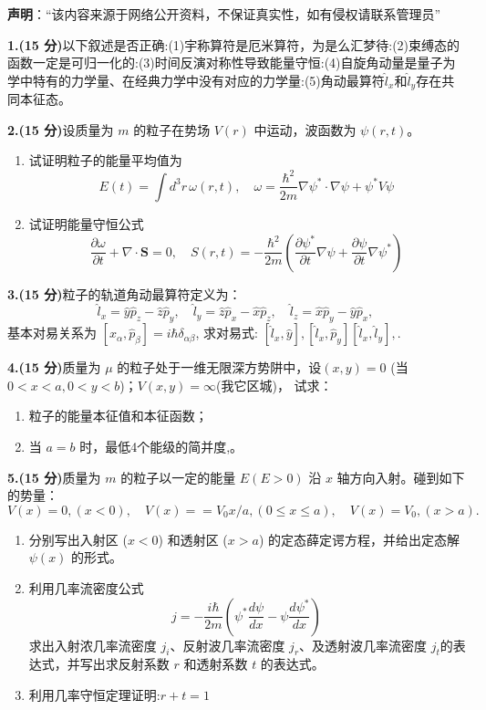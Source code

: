 
\textbf{声明}：“该内容来源于网络公开资料，不保证真实性，如有侵权请联系管理员”

\textbf{1.(15 分)}以下叙述是否正确:(1)宇称算符是厄米算符，为是么汇梦待:(2)束缚态的函数一定是可归一化的:(3)时间反演对称性导致能量守恒:(4)自旋角动量是量子为学中特有的力学量、在经典力学中没有对应的力学量:(5)角动最算符$\hat{l}_x$和$\hat{l}_y$存在共同本征态。

\textbf{2.(15 分)}设质量为 $m$ 的粒子在势场 $V(r)$ 中运动，波函数为 $\psi(r,t)$。

\begin{enumerate}
    \item  试证明粒子的能量平均值为
    \[
    E(t) = \int d^3r \, \omega(r,t), \quad \omega = \frac{\hbar^2}{2m} \nabla \psi^* \cdot \nabla \psi + \psi^* V \psi~
    \]
    
    \item  试证明能量守恒公式
    \[
    \frac{\partial \omega}{\partial t} + \nabla \cdot \mathbf{S} = 0, \quad S(r,t) = -\frac{\hbar^2}{2m} \left(\frac{\partial \psi^*}{\partial t} \nabla \psi + \frac{\partial \psi}{\partial t} \nabla \psi^*\right)~
    \]
\end{enumerate}
\textbf{3.(15 分)}粒子的轨道角动最算符定义为：
\[
\hat{l}_x = \hat{y} \hat{p}_z - \hat{z} \hat{p}_y, \quad \hat{l}_y = \hat{z} \hat{p}_x - \hat{x} \hat{p}_z, \quad \hat{l}_z = \hat{x} \hat{p}_y - \hat{y} \hat{p}_x,~
\]
基本对易关系为
$[\hat{x}_\alpha, \hat{p}_\beta] = i\hbar \delta_{\alpha\beta}$, 求对易式: $[\hat{l}_x, \hat{y}] ,  [\hat{l}_x, \hat{p}_y] [\hat{l}_x, \hat{l}_y] , .$

\textbf{4.(15 分)}质量为 $\mu$ 的粒子处于一维无限深方势阱中，设$(x,y)=0$ (当 $0 < x < a, 0 < y < b$)；$V(x, y) =\infty$(我它区城)，
试求：
\begin{enumerate}
    \item  粒子的能量本征值和本征函数；
    \item  当 $a = b$ 时，最低4个能级的简并度,。
\end{enumerate}

\textbf{5.(15 分)}质量为 $m$ 的粒子以一定的能量 $E (E > 0)$ 沿 $x$ 轴方向入射。碰到如下的势量：
\[
V(x) = 0, (x < 0), \quad V(x) = =V_0 x/a, (0 \leq x \leq a), \quad V(x) = V_0, (x > a).~
\]

\begin{enumerate}
    \item  分别写出入射区 ($x < 0$) 和透射区 ($x > a$) 的定态薛定谔方程，并给出定态解 $\psi(x)$ 的形式。
    
    \item  利用几率流密度公式
    \[
    j = -\frac{i\hbar}{2m} \left(\psi^* \frac{d\psi}{dx} - \psi \frac{d\psi^*}{dx} \right)~
    \]
    求出入射浓几率流密度 $j_i$、反射波几率流密度 $j_r$、及透射波几率流密度 $j_t$的表达式，并写出求反射系数 $r$ 和透射系数 $t$ 的表达式。
    \item  利用几率守恒定理证明:$r+t=1$
\end{enumerate}

